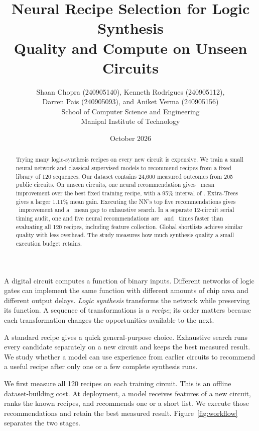\documentclass[11pt,a4paper]{article}
\title{\textbf{Neural Recipe Selection for Logic Synthesis\\Quality and Compute on Unseen Circuits}}
\author{Shaan Chopra (240905140), Kenneth Rodrigues (240905112),\\
Darren Pais (240905093), and Aniket Verma (240905156)\\[0.4em]
\small School of Computer Science and Engineering\\
\small Manipal Institute of Technology}
\date{October 2026}
\makeatletter
\renewcommand\section{\@startsection{section}{1}{\z@}{1.3em}{.4em}{\normalfont\large\bfseries}}
\makeatother
\begin{document}
\maketitle
\begin{abstract}
\noindent
Trying many logic-synthesis recipes on every new circuit is expensive. We train a small neural network and classical supervised models to recommend recipes from a fixed library of 120 sequences. Our dataset contains 24,600 measured outcomes from 205 public circuits. On unseen circuits, one neural recommendation gives \NNGain\ mean improvement over the best fixed training recipe, with a 95\% interval of \NNCI. Extra-Trees gives a larger 1.11\% mean gain. Executing the NN's top five recommendations gives \NNFiveGain\ improvement and a \NNFiveRegret\ mean gap to exhaustive search. In a separate 12-circuit serial timing audit, one and five neural recommendations are \NNOneSpeedup\ and \NNFiveSpeedup\ times faster than evaluating all 120 recipes, including feature collection. Global shortlists achieve similar quality with less overhead. The study measures how much synthesis quality a small execution budget retains.
\end{abstract}

\section{Problem and Approach}

A digital circuit computes a function of binary inputs. Different networks of logic gates can implement the same function with different amounts of chip area and different output delays. \emph{Logic synthesis} transforms the network while preserving its function. A sequence of transformations is a \emph{recipe}; its order matters because each transformation changes the opportunities available to the next.

A standard recipe gives a quick general-purpose choice. Exhaustive search runs every candidate separately on a new circuit and keeps the best measured result. We study whether a model can use experience from earlier circuits to recommend a useful recipe after only one or a few complete synthesis runs.

We first measure all 120 recipes on each training circuit. This is an offline dataset-building cost. At deployment, a model receives features of a new circuit, ranks the known recipes, and recommends one or a short list. We execute those recommendations and retain the best measured result. Figure~\ref{fig:workflow} separates the two stages.
\end{document}
